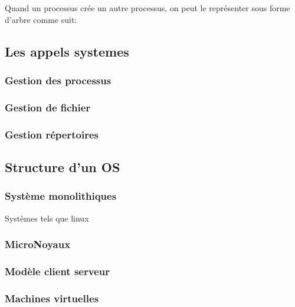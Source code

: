     Quand un processus crée un autre processus, on peut le représenter sous forme d'arbre comme suit: 


    \subsection{Les appels systemes}


    \subsubsection{Gestion des processus}

    \subsubsection{Gestion de fichier}

    \subsubsection{Gestion répertoires}

\subsection{Structure d'un OS}
    \subsubsection{Système monolithiques}
        Systèmes tels que linux
    \subsubsection{MicroNoyaux}
    \subsubsection{Modèle client serveur}
    \subsubsection{Machines virtuelles}




